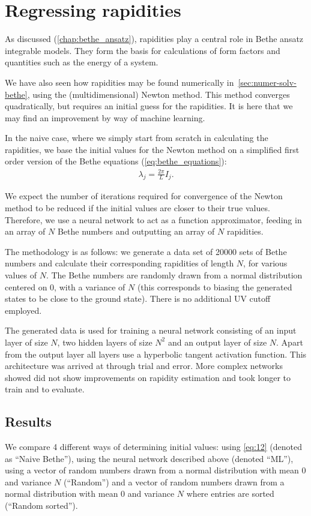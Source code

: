 \documentclass[11pt, a4paper]{report} %
\begin{document}
\section{Regressing rapidities}

As discussed (\cref{chap:bethe_ansatz}), rapidities play a central role in Bethe ansatz integrable models.
They form the basis for calculations of form factors and quantities such as the energy of a system.

We have also seen how rapidities may be found numerically in~\cref{sec:numer-solv-bethe}, using the (multidimensional) Newton method.
This method converges quadratically, but requires an initial guess for the rapidities.
It is here that we may find an improvement by way of machine learning.

In the naive case, where we simply start from scratch in calculating the rapidities, we base the initial values for the Newton method on a simplified first order version of the Bethe equations (\cref{eq:bethe_equations}):
\begin{align}
  \label{eq:12}
  \lambda_j = \frac{2\pi}{L} I_j.
\end{align}

We expect the number of iterations required for convergence of the Newton method to be reduced if the initial values are closer to their true values.
Therefore, we use a neural network to act as a function approximator, feeding in an array of \(N\) Bethe numbers and outputting an array of \(N\) rapidities.

The methodology is as follows: we generate a data set of 20000 sets of Bethe numbers and calculate their corresponding rapidities of length \(N\), for various values of \(N\).
The Bethe numbers are randomly drawn from a normal distribution centered on 0, with a variance of \(N\) (this corresponds to biasing the generated states to be close to the ground state).
There is no additional UV cutoff employed.

The generated data is used for training a neural network consisting of an input layer of size \(N\), two hidden layers of size \(N^2\) and an output layer of size \(N\).
Apart from the output layer all layers use a hyperbolic tangent activation function.
This architecture was arrived at through trial and error.
More complex networks showed did not show improvements on rapidity estimation and took longer to train and to evaluate.

\subsection{Results}
We compare 4 different ways of determining initial values: using \cref{eq:12} (denoted as ``Naive Bethe''), using the neural network described above (denoted ``ML''), using a vector of random numbers drawn from a normal distribution with mean 0 and variance \(N\) (``Random'') and a vector of random numbers drawn from a normal distribution with mean 0 and variance \(N\) where entries are sorted (``Random sorted'').
\end{document}
